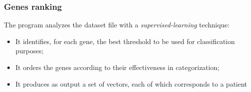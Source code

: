     \subsubsection{Genes ranking}

        The  program analyzes the dataset file with
        a \emph{supervised-learning} technique:
        \begin{itemize}
        \item   It identifies, for each gene, the best threshold to be
                used for classification purposes;
        \item   It orders the genes according to their effectiveness in
                categorization;
        \item   It produces as output a set of vectors, each of which
                corresponds to a patient
        \end{itemize}

